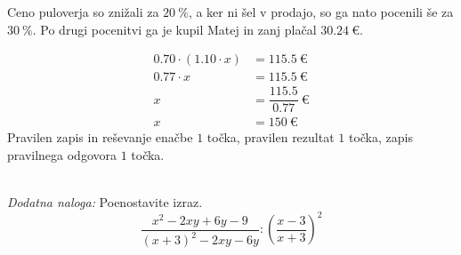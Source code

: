 \documentclass[addpoints]{exam}
\begin{document}
\begin{questions}
        \newpage


        \question
        Ceno puloverja so znižali za $20~\%$, a ker ni šel v prodajo, so ga nato pocenili še za $30~\%$.
        Po drugi pocenitvi ga je kupil Matej in zanj plačal $30.24~\euro$.


        \begin{solution}[4cm]
            \begin{align*}
                0.70\cdot \left(1.10\cdot x\right) &=115.5~\euro \\
                                     0.77 \cdot x &= 115.5~\euro \\
                                                x &= \dfrac{115.5}{0.77}~\euro \\
                                                x &= 150~\euro
            \end{align*}
            Pravilen zapis in reševanje enačbe $1$ točka, pravilen rezultat $1$ točka, zapis pravilnega odgovora $1$ točka.
        \end{solution}
     ~\\


    \bonusquestion[4]
    \textit{Dodatna naloga:} Poenostavite izraz. $$ \dfrac{x^2-2xy+6y-9}{(x+3)^2-2xy-6y}:\left(\dfrac{x-3}{x+3}\right)^2 $$


\end{questions}
\end{document}
